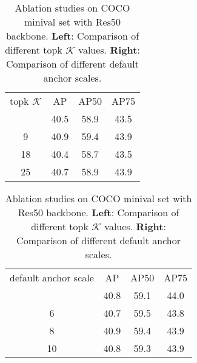 \documentclass[runningheads]{llncs}
\begin{document}
\begin{table}
\begin{center}
\caption {Ablation studies on COCO minival set with Res50 backbone. \textbf{Left}: Comparison of different topk $\mathcal{K}$ values. \textbf{Right}: Comparison of different default anchor scales.}
\begin{minipage}{.4\linewidth}
\centering
\begin{tabular}{c|ccc}
\hline\noalign{\smallskip}
topk $\mathcal{K}$ & AP & AP50 & AP75 \\
\noalign{\smallskip}
\hline
5 & 40.5 & 58.9 & 43.5\\
 9 & 40.9 & 59.4 & 43.9\\
 18 & 40.4 & 58.7 & 43.5\\
 25 & 40.7 & 58.9 & 43.9\\
\hline
\end{tabular}
\label{table:extra_ablation_topk}
\end{minipage}\begin{minipage}{.6\linewidth}
\centering
\begin{tabular}{c|ccc}
\hline\noalign{\smallskip}
default anchor scale & AP & AP50 & AP75 \\
\noalign{\smallskip}
\hline
4 & 40.8 & 59.1 & 44.0\\
 6 & 40.7 & 59.5 & 43.8\\
 8 & 40.9 & 59.4 & 43.9\\
 10 & 40.8 & 59.3 & 43.9\\
\hline
\end{tabular}
\label{table:extra_ablation_default_anchor_scale}
\end{minipage}\end{center}
\end{table}
\end{document}

